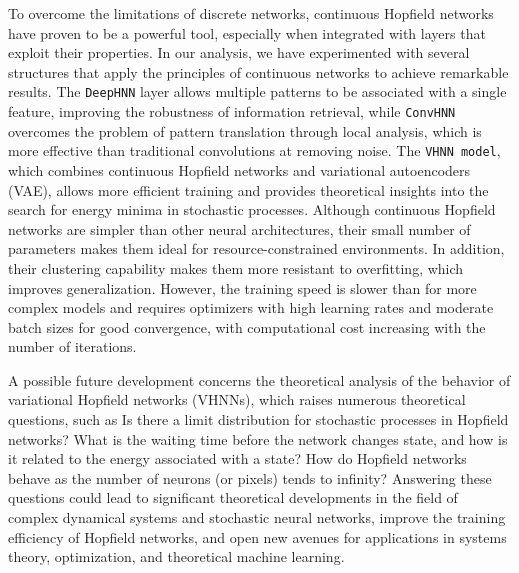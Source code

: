 \noindent To overcome the limitations of discrete networks, continuous Hopfield networks have proven to be a powerful tool, especially when integrated with layers that exploit their properties. In our analysis, we have experimented with several structures that apply the principles of continuous networks to achieve remarkable results. The \texttt{DeepHNN} layer allows multiple patterns to be associated with a single feature, improving the robustness of information retrieval, while \texttt{ConvHNN} overcomes the problem of pattern translation through local analysis, which is more effective than traditional convolutions at removing noise. The \texttt{VHNN model}, which combines continuous Hopfield networks and variational autoencoders (VAE), allows more efficient training and provides theoretical insights into the search for energy minima in stochastic processes. Although continuous Hopfield networks are simpler than other neural architectures, their small number of parameters makes them ideal for resource-constrained environments. In addition, their clustering capability makes them more resistant to overfitting, which improves generalization. However, the training speed is slower than for more complex models and requires optimizers with high learning rates and moderate batch sizes for good convergence, with computational cost increasing with the number of iterations.

\noindent A possible future development concerns the theoretical analysis of the behavior of variational Hopfield networks (VHNNs), which raises numerous theoretical questions, such as Is there a limit distribution for stochastic processes in Hopfield networks? What is the waiting time before the network changes state, and how is it related to the energy associated with a state? How do Hopfield networks behave as the number of neurons (or pixels) tends to infinity? Answering these questions could lead to significant theoretical developments in the field of complex dynamical systems and stochastic neural networks, improve the training efficiency of Hopfield networks, and open new avenues for applications in systems theory, optimization, and theoretical machine learning.
